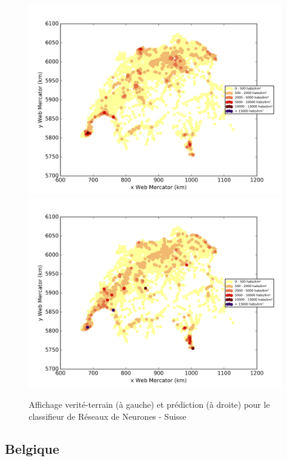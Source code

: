 \documentclass{book}
\begin{document}
\begin{figure}[H]
\centerline{
\includegraphics[scale=0.5]{../../data/Suisse/test/Neural_Network_Classification-oversampling/Neural_Network_Classification-oversampling/density_ground_truth.png}
\includegraphics[scale=0.5]{../../data/Suisse/test/Neural_Network_Classification-oversampling/Neural_Network_Classification-oversampling/density_classification.png}
}
\caption{Affichage verité-terrain (à gauche) et prédiction (à droite) pour le classifieur de Réseaux de Neurones - Suisse}
\label{nn_carte_suisse}
\end{figure}


\subsection{Belgique}
\end{document}
